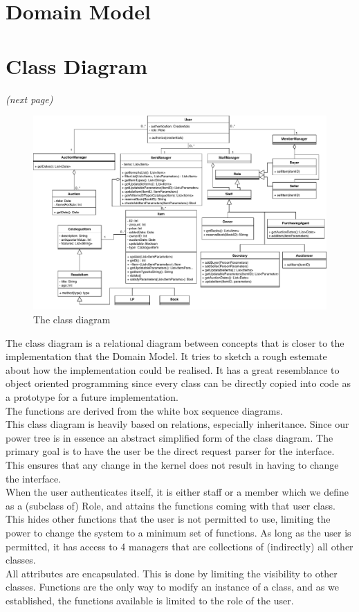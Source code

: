 \documentclass{article}
\begin{document}
\section{Domain Model}

\section{Class Diagram}
\textit{(next page)}
\begin{landscape}
\begin{figure}[H]
	\centering
	\includegraphics[scale=.85]{uml/classdiagramUPD3.pdf}
	\caption*{The class diagram}
\end{figure}
\end{landscape}


The class diagram is a relational diagram between concepts that is closer to the implementation that the Domain Model. It tries to sketch a rough estemate about how the implementation could be realised. It has a great resemblance to object oriented programming since every class can be directly copied into code as a prototype for a future implementation.\\
The functions are derived from the white box sequence diagrams.\\
This class diagram is heavily based on relations, especially inheritance. Since our power tree is in essence an abstract simplified form of the class diagram. The primary goal is to have the user be the direct request parser for the interface. This ensures that any change in the kernel does not result in having to change the interface.\\
When the user authenticates itself, it is either staff or a member which we define as a (subclass of) Role, and attains the functions coming with that user class. This hides other functions that the user is not permitted to use, limiting the power to change the system to a minimum set of functions. As long as the user is permitted, it has access to 4 managers that are collections of (indirectly) all other classes.\\
All attributes are encapsulated. This is done by limiting the visibility to other classes. Functions are the only way to modify an instance of a class, and as we established, the functions available is limited to the role of the user.\\
\end{document}
